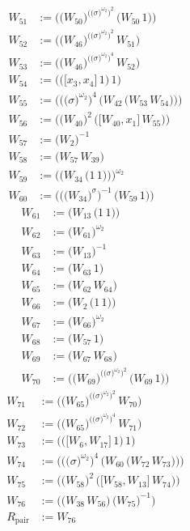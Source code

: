 \begin{align*}
W_{51} &:= \bigl(\bigl(W_{50}\bigr)^{\bigl(\bigl(\sigma\bigr)^{\omega_2}\bigr)^{2}}\,\bigl(W_{50}\,1\bigr)\bigr) \\
W_{52} &:= \bigl(\bigl(W_{46}\bigr)^{\bigl(\bigl(\sigma\bigr)^{\omega_2}\bigr)^{2}}\,W_{51}\bigr) \\
W_{53} &:= \bigl(\bigl(W_{46}\bigr)^{\bigl(\bigl(\sigma\bigr)^{\omega_2}\bigr)^{4}}\,W_{52}\bigr) \\
W_{54} &:= \bigl(\bigl(\bigl[x_{3},x_{4}\bigr]\,1\bigr)\,1\bigr) \\
W_{55} &:= \bigl(\bigl(\bigl(\sigma\bigr)^{\omega_2}\bigr)^{4}\,\bigl(W_{42}\,\bigl(W_{53}\,W_{54}\bigr)\bigr)\bigr) \\
W_{56} &:= \bigl(\bigl(W_{40}\bigr)^{2}\,\bigl(\bigl[W_{40},x_{1}\bigr]\,W_{55}\bigr)\bigr) \\
W_{57} &:= \bigl(W_{2}\bigr)^{-1} \\
W_{58} &:= \bigl(W_{57}\,W_{39}\bigr) \\
W_{59} &:= \bigl(\bigl(W_{34}\,\bigl(1\,1\bigr)\bigr)\bigr)^{\omega_2} \\
W_{60} &:= \bigl(\bigl(\bigl(W_{34}\bigr)^{\sigma}\bigr)^{-1}\,\bigl(W_{59}\,1\bigr)\bigr)
\end{align*}
\begin{align*}
W_{61} &:= \bigl(W_{13}\,\bigl(1\,1\bigr)\bigr) \\
W_{62} &:= \bigl(W_{61}\bigr)^{\omega_2} \\
W_{63} &:= \bigl(W_{13}\bigr)^{-1} \\
W_{64} &:= \bigl(W_{63}\,1\bigr) \\
W_{65} &:= \bigl(W_{62}\,W_{64}\bigr) \\
W_{66} &:= \bigl(W_{2}\,\bigl(1\,1\bigr)\bigr) \\
W_{67} &:= \bigl(W_{66}\bigr)^{\omega_2} \\
W_{68} &:= \bigl(W_{57}\,1\bigr) \\
W_{69} &:= \bigl(W_{67}\,W_{68}\bigr) \\
W_{70} &:= \bigl(\bigl(W_{69}\bigr)^{\bigl(\bigl(\sigma\bigr)^{\omega_2}\bigr)^{2}}\,\bigl(W_{69}\,1\bigr)\bigr)
\end{align*}
\begin{align*}
W_{71} &:= \bigl(\bigl(W_{65}\bigr)^{\bigl(\bigl(\sigma\bigr)^{\omega_2}\bigr)^{2}}\,W_{70}\bigr) \\
W_{72} &:= \bigl(\bigl(W_{65}\bigr)^{\bigl(\bigl(\sigma\bigr)^{\omega_2}\bigr)^{4}}\,W_{71}\bigr) \\
W_{73} &:= \bigl(\bigl(\bigl[W_{6},W_{17}\bigr]\,1\bigr)\,1\bigr) \\
W_{74} &:= \bigl(\bigl(\bigl(\sigma\bigr)^{\omega_2}\bigr)^{4}\,\bigl(W_{60}\,\bigl(W_{72}\,W_{73}\bigr)\bigr)\bigr) \\
W_{75} &:= \bigl(\bigl(W_{58}\bigr)^{2}\,\bigl(\bigl[W_{58},W_{13}\bigr]\,W_{74}\bigr)\bigr) \\
W_{76} &:= \bigl(\bigl(W_{38}\,W_{56}\bigr)\,\bigl(W_{75}\bigr)^{-1}\bigr) \\
R_{\mathrm{pair}} &:= W_{76}
\end{align*}

